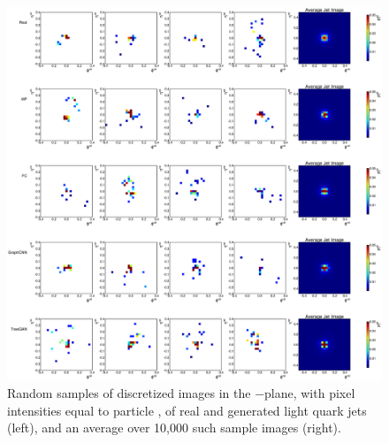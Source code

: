 \begin{figure}[htpb]
    \centering
    \centerline{\includegraphics[width=\textwidth]{figures/04-ML4Sim/mpgan/results/jet_images_q.pdf}}
    \caption{Random samples of discretized images in the \etarel$-$\phirel plane, with pixel intensities equal to particle \ptrel, of real and generated light quark jets (left), and an average over 10,000 such sample images (right).}
    \label{fig:04_mpgan_jetims_q}
\end{figure}

